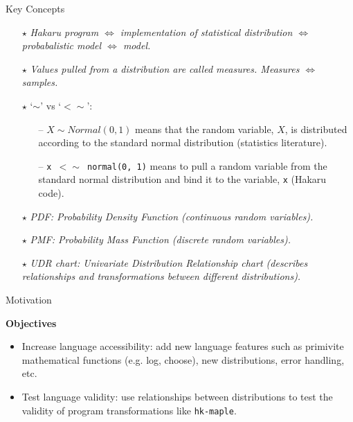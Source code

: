 \documentclass[22pt]{beamer}
\begin{document}
\begin{frame}[fragile]
\begin{textblock}{5}
\begin{block}{\Large{Key Concepts}}
\scriptsize{
\begin{itemize}
  \item[\textbf{$\star$}] \textit{Hakaru program $\Longleftrightarrow$ implementation of statistical distribution $\Longleftrightarrow$ probabalistic model $\Longleftrightarrow$ model.}
  \item[\textbf{$\star$}] \textit{Values pulled from a distribution are called measures. Measures $\Longleftrightarrow$ samples.}
  \item[\textbf{$\star$}] `{\textbf{$\sim$}}' vs `{\textbf{$<\sim$}}':
      \begin{itemize}
          \tiny
          \item[--] \tiny{$X \sim Normal(0, 1)$ means that the random variable, $X$, is distributed according to the standard normal distribution (statistics literature).}
          \item[--] \tiny{{\tt \tiny{x $<\sim$ normal(0, 1)}} means to pull a random variable from the standard normal distribution and bind it to the variable, {\tt \tiny{x}} (Hakaru code).}
      \end{itemize}
  \item[\textbf{$\star$}] \textit{PDF: Probability Density Function (continuous random variables).}
  \item[\textbf{$\star$}] \textit{PMF: Probability Mass Function (discrete random variables).}
  \item[\textbf{$\star$}] \textit{UDR chart: Univariate Distribution Relationship chart (describes relationships and transformations between different distributions).}
\end{itemize}
}
\end{block}


\begin{block}{\Large{Motivation}}
\justifying


\normalsize{\textbf{Objectives}}

\scriptsize{
\begin{itemize}
  \item Increase language accessibility: add new language features such as primivite mathematical functions (e.g. log, choose), new distributions, error handling, etc.
  \item Test language validity: use relationships between distributions to test the validity of program transformations like {\tt \scriptsize{hk-maple}}. 
\end{itemize}
}




\end{block}
\end{textblock}
\end{frame}
\end{document}
